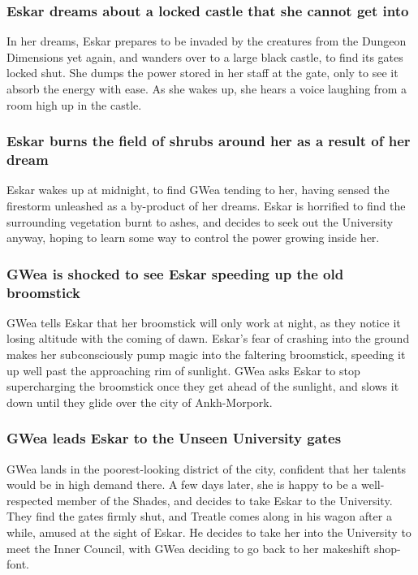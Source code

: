 \subsubsection{\Gls{Eskar} dreams about a locked castle that she cannot get into}
In her dreams, \Gls{Eskar} prepares to be invaded by the creatures from the Dungeon Dimensions yet
again, and wanders over to a large black castle, to find its gates locked shut. She dumps the power
stored in her staff at the gate, only to see it absorb the energy with ease. As she wakes up, she
hears a voice laughing from a room high up in the castle.

\subsubsection{\Gls{Eskar} burns the field of shrubs around her as a result of her dream}
\Gls{Eskar} wakes up at midnight, to find \Gls{GWea} tending to her, having sensed the firestorm
unleashed as a by-product of her dreams. \Gls{Eskar} is horrified to find the surrounding vegetation
burnt to ashes, and decides to seek out the University anyway, hoping to learn some way to
control the power growing inside her.

\subsubsection{\Gls{GWea} is shocked to see \Gls{Eskar} speeding up the old broomstick}
\Gls{GWea} tells \Gls{Eskar} that her broomstick will only work at night, as they notice it losing
altitude with the coming of dawn. \Gls{Eskar}'s fear of crashing into the ground makes her
subconsciously pump magic into the faltering broomstick, speeding it up well past the approaching
rim of sunlight. \Gls{GWea} asks \Gls{Eskar} to stop supercharging the broomstick once they get
ahead of the sunlight, and slows it down until they glide over the city of Ankh-Morpork.

\subsubsection{\Gls{GWea} leads \Gls{Eskar} to the Unseen University gates}
\Gls{GWea} lands in the poorest-looking district of the city, confident that her talents would be in
high demand there. A few days later, she is happy to be a well-respected member of the Shades, and
decides to take \Gls{Eskar} to the University. They find the gates firmly shut, and \Gls{Treatle}
comes along in his wagon after a while, amused at the sight of \Gls{Eskar}. He decides to take her
into the University to meet the Inner Council, with \Gls{GWea} deciding to go back to her makeshift
shop-font.

